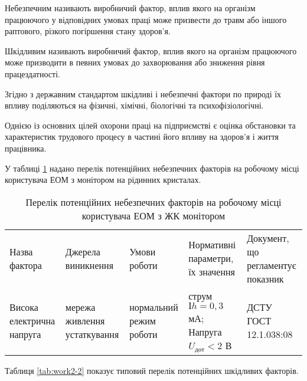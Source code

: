 Небезпечним називають виробничий фактор, вплив якого на організм працюючого у відповідних умовах праці може призвести до травм або іншого раптового, різкого погіршення стану здоров’я.

Шкідливим називають виробничий фактор, вплив якого на організм працюючого може призводити в певних умовах до захворювання або зниження рівня працездатності.

Згідно з державним стандартом шкідливі і небезпечні фактори по природі їх впливу поділяються на фізичні, хімічні, біологічні та психофізіологічні.

Однією із основних цілей охорони праці на підприємстві є оцінка обстановки та характеристик трудового процесу в частині його впливу на здоров’я і життя працівника.

У таблиці \ref{tab:work2-1} надано перелік потенційних небезпечних факторів на робочому місці користувача ЕОМ з монітором на рідинних кристалах.

\begin{table}[hbt]
	\captionstyle{ \raggedright}
	\caption{Перелік потенційних небезпечних факторів на робочому місці користувача ЕОМ з ЖК монітором}\label{tab:work2-1}
	\begin{tabular}{|m{}|m{}|m{}|m{}|m{}|}
		\hline
		Назва фактора& Джерела виникнення& Умови роботи& Нормативні параметри, їх значення & Документ, що регламентує показник \\
		\hlinewd{2pt}
		Висока електрична напруга & мережа живлення устаткування & нормальний режим роботи & струм $Іh = 0,3$ мА; Напруга $U_\text{дот} < 2$ В & ДСТУ ГОСТ 12.1.038:08 \\
		\hline
	\end{tabular}
\end{table}

Таблиця \ref{tab:work2-2} показує типовий перелік потенційних шкідливих факторів.

\newpage

